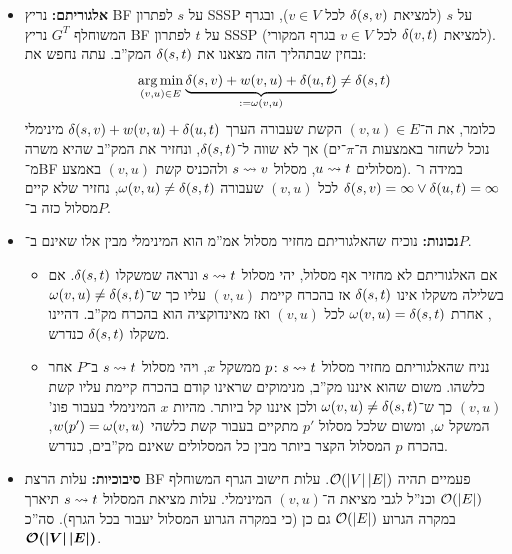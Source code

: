 \documentclass[]{../../../../tex/classes/homework}
\DeclareMathOperator*{\argmin}{arg\,min}
\begin{document}
	\begin{itemize}
		\item \textbf{אלגוריתם: }נריץ BF על $s$ לפתרון SSSP על $s$ (למציאת $\delta(s, v)$ לכל $v \in V$), ובגרף המשוחלף $G^{T}$ נריץ BF על $t$ לפתרון SSSP (למציאת $\delta(v, t)$ לכל $v \in V$ בגרף המקורי). נבחין שבתהליך הזה מצאנו את $\delta(s, t)$ המק''ב. עתה נחפש את: 
		\[ \argmin_{(v, u) \in E} \underbrace{\dg(s, v) + w(v, u) + \dg(u, t)}_{: =\wg(v, u)} \neq \dg(s, t) \]
		כלומר, את ה־$(v, u) \in E$ הקשת שעבורה הערך $\delta(s, v) + w(v, u) + \delta(u, t)$ מינימלי אך לא שווה ל־$\delta(s, t)$, ונחזיר את המק''ב שהיא משרה (נוכל לשחזר באמצעות ה־$\pi$־ים מ־BF מסלולים $u \rightsquigarrow t$, מסלול $s \rightsquigarrow v$ ולהכניס קשת $(v, u)$ באמצע). במידה ו־$\delta(s, v) = \infty \lor \delta(u, t) = \infty$ לכל $(v, u)$ שעבורה $\omega(v, u) \neq \delta(s, t)$, נחזיר שלא קיים מסלול כזה ב־$P$. 
		\item \textbf{נכונות: }נוכיח שהאלגוריתם מחזיר מסלול אמ''מ הוא המינימלי מבין אלו שאינם ב־$P$. 
		\begin{itemize}
			\item אם האלגוריתם לא מחזיר אף מסלול, יהי מסלול $s \rightsquigarrow t$ ונראה שמשקלו $\delta(s, t)$. אם בשלילה משקלו אינו $\delta(s, t)$ אז בהכרח קיימת $(v, u)$ עליו כך ש־$\omega(v, u) \neq \delta(s, t)$, אחרת $\omega(v, u) = \delta(s,t)$ לכל $(v, u)$ ואז מאינדוקציה הוא בהכרח מק''ב. דהיינו משקלו $\delta(s, t)$ כנדרש. 
			\item נניח שהאלגוריתם מחזיר מסלול $p \colon s \rightsquigarrow t$ ממשקל $x$, ויהי מסלול $s \rightsquigarrow t$ ב־$P$ אחר כלשהו. משום שהוא איננו מק''ב, מנימוקים שראינו קודם בהכרח קיימת עליו קשת $(v, u)$ כך ש־$\omega(v, u) \neq \delta(s, t)$ ולכן איננו קל ביותר. מהיות $x$ המינימלי בעבור פונ' המשקל $\omega$, ומשום שלכל מסלול $p'$ מתקיים בעבור קשת כלשהי $w(p') = \omega(v, u)$, בהכרח $p$ המסלול הקצר ביותר מבין כל המסלולים שאינם מק''בים, כנדרש. 
		\end{itemize}
		\item \textbf{סיבוכיות: }עלות הרצת BF פעמיים תהיה $\mathcal{O}(\left \lvert V \right \rvert \left \lvert E \right \rvert)$. עלות חישוב הגרף המשוחלף $\mathcal{O}(\left \lvert E \right \rvert)$ וכנ''ל לגבי מציאת ה־$(v, u)$ המינימלי. עלות מציאת המסלול $s \rightsquigarrow t$ תיארך במקרה הגרוע $\mathcal{O}(\left \lvert E \right \rvert)$ גם כן (כי במקרה הגרוע המסלול יעבור בכל הגרף). סה''כ $\bm{\mathcal{O}(\left \lvert V \right \rvert \left \lvert E \right \rvert)}$. 
	\end{itemize}
	
	\npage
\end{document}
